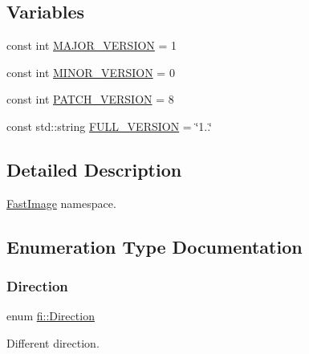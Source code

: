 \subsection*{Variables}
\begin{DoxyCompactItemize}
\item 
const int \hyperlink{namespacefi_afe2f57440da92fd8c3eebda3a33e7556}{M\+A\+J\+O\+R\+\_\+\+V\+E\+R\+S\+I\+ON} = 1
\item 
const int \hyperlink{namespacefi_a879229879c7f2a74c9a8b26495ab64ae}{M\+I\+N\+O\+R\+\_\+\+V\+E\+R\+S\+I\+ON} = 0
\item 
const int \hyperlink{namespacefi_aaa7396b6cc73524dbd906ce5af6317fc}{P\+A\+T\+C\+H\+\_\+\+V\+E\+R\+S\+I\+ON} = 8
\item 
const std\+::string \hyperlink{namespacefi_afaee9ec38f2807bff312e7ea8ec993ce}{F\+U\+L\+L\+\_\+\+V\+E\+R\+S\+I\+ON} = \char`\"{}1..\char`\"{}
\end{DoxyCompactItemize}


\subsection{Detailed Description}
\hyperlink{classfi_1_1FastImage}{Fast\+Image} namespace. 

\subsection{Enumeration Type Documentation}
\mbox{\label{namespacefi_ac2e0fa52c14712db1a6e70da35ae8352}} 
\subsubsection{\texorpdfstring{Direction}{Direction}}
{\footnotesize\ttfamily enum \hyperlink{namespacefi_ac2e0fa52c14712db1a6e70da35ae8352}{fi\+::\+Direction}\hspace{0.3cm}{\ttfamily [strong]}}



Different direction. 

